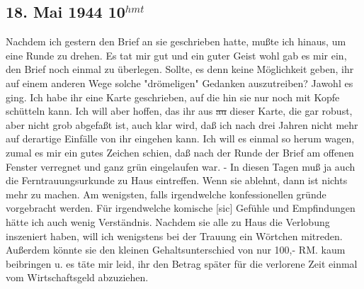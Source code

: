 \subsection{18. Mai 1944 10$^{hmt}$}

Nachdem ich gestern den Brief an sie geschrieben hatte, mu{\ss}te ich hinaus, um eine Runde zu drehen.
Es tat mir gut und ein guter Geist wohl gab es mir ein, den Brief noch einmal zu \"{u}berlegen.
Sollte, es denn keine M\"{o}glichkeit geben, ihr auf einem anderen Wege solche "dr\"{o}meligen" Gedanken auszutreiben?
Jawohl es ging.
Ich habe ihr eine Karte geschrieben, auf die hin sie nur noch mit Kopfe sch\"{u}tteln kann.
Ich will aber hoffen, das ihr aus \st{au} dieser Karte, die gar robust, aber nicht grob abgefa{\ss}t ist, auch klar wird, da{\ss} ich nach drei Jahren nicht mehr auf derartige Einf\"{a}lle von ihr eingehen kann.
Ich will es einmal so herum wagen, zumal es mir ein gutes Zeichen schien, da{\ss} nach der Runde der Brief am offenen Fenster verregnet und ganz gr\"{u}n eingelaufen war.
- In diesen Tagen mu{\ss} ja auch die Ferntrauungsurkunde zu Haus eintreffen.
Wenn sie ablehnt, dann ist nichts mehr zu machen.
Am wenigsten, falls irgendwelche konfessionellen gr\"{u}nde vorgebracht werden.
F\"{u}r irgendwelche komische{\color{red} [sic] } Gef\"{u}hle und Empfindungen h\"{a}tte ich auch wenig Verst\"{a}ndnis.
Nachdem sie alle zu Haus die Verlobung inszeniert haben, will ich wenigstens bei der Trauung ein W\"{o}rtchen mitreden.
Au{\ss}erdem k\"{o}nnte sie den kleinen Gehaltsunterschied von nur 100,- RM. kaum beibringen u. es t\"{a}te mir leid, ihr den Betrag sp\"{a}ter f\"{u}r die verlorene Zeit einmal vom Wirtschaftsgeld abzuziehen.

\clearpage
